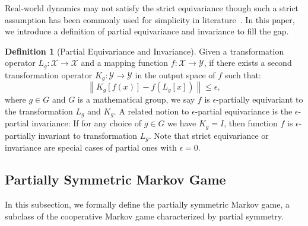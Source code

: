 \documentclass[letterpaper]{article} %
\theoremstyle{definition}
\newtheorem{definition}{Definition}
\begin{document}
Real-world dynamics may not satisfy the strict equivariance though such a strict assumption has been commonly used for simplicity in literature~\cite{so2,homon}. In this paper, we introduce a definition of partial equivariance and invariance to fill the gap.
\begin{definition}[Partial Equivariance and Invariance]
Given a transformation operator $L_g: \mathcal{X} \rightarrow \mathcal{X}$ and a mapping function $f: \mathcal{X} \rightarrow \mathcal{Y}$, if there exists a second transformation operator $K_g: \mathcal{Y} \rightarrow \mathcal{Y}$ in the output space of $f$ such that:
\begin{equation*}
   \left \| K_g[f(x)]-f\left(L_g[x]\right) \right \| \leq \epsilon \label{equimp},
\end{equation*} 
where $g \in G$ and $G$ is a mathematical group, we say $f$ is $\epsilon$-partially equivariant to the transformation $L_g$ and $K_g$. A related notion to $\epsilon$-partial equivariance is the $\epsilon$-partial invariance: If for any choice of $g \in G$ we have  $K_g=I$, then function $f$ is $\epsilon$-partially invariant to transformation $L_g$. Note that strict equivariance or invariance are special cases of partial ones with $\epsilon = 0$.
\end{definition}




\subsection{Partially Symmetric Markov Game}
In this subsection, we formally define the partially symmetric Markov game, a subclass of the cooperative Markov game characterized by partial symmetry.
\end{document}
